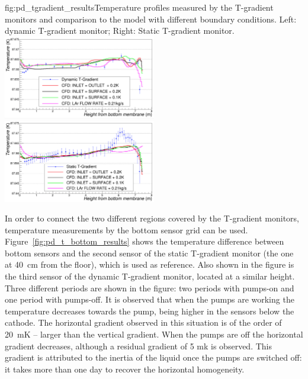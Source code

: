 \begin{dunefigure}{fig:pd_tgradient_results}{Temperature profiles measured by the T-gradient monitors and comparison to the  model with different boundary conditions. Left: dynamic T-gradient monitor; Right: Static T-gradient monitor.}
  \includegraphics[width=0.5\textwidth]{graphics/cisc_dynamic_cfd_data.png}%
  \includegraphics[width=0.5\textwidth]{graphics/cisc_static_cfd_data.png}%
\end{dunefigure}

In order to connect the two different %
regions covered by the T-gradient monitors, temperature measurements by the bottom sensor grid can be used. Figure~\ref{fig:pd_t_bottom_results} shows the temperature difference between bottom sensors and the second sensor of the static T-gradient monitor (the one at 40~cm from the floor), which is used as reference. %
Also shown in the figure is the third sensor of the dynamic T-gradient monitor, located at a similar height. Three different periods are shown in the figure: two periods with pumps-on and one period with pumps-off. It is observed that when the pumps are working the temperature decreases towards the  pump, being  higher in the sensors below the cathode. The horizontal gradient observed in this situation is of the order of 20~mK -- larger than the vertical gradient. When the pumps are off the horizontal gradient decreases, although a residual gradient of 5 mk is observed. This gradient is attributed to the inertia of the liquid once the pumps are switched off: it takes more than one day to recover the horizontal homogeneity.    

